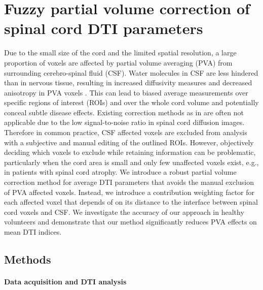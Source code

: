 \section{Fuzzy partial volume correction of spinal cord DTI parameters} 
Due to the small size of the cord and the limited spatial resolution, a large proportion of voxels are affected by partial volume averaging (PVA) from surrounding cerebro-spinal fluid (CSF). Water molecules in CSF are less hindered than in nervous tissue, resulting in increased diffusivity measures and decreased anisotropy in PVA voxels \citep{Alexander:2001,Pfefferbaum:2003}. This can lead to biased average measurements over specific regions of interest (ROIs) and over the whole cord volume and potentially conceal subtle disease effects. Existing correction methods as in \citet{Pasternak:2009} are often not applicable due to the low signal-to-noise ratio in spinal cord diffusion images. Therefore in common practice, CSF affected voxels are excluded from analysis with a subjective and manual editing of the outlined ROIs. However, objectively deciding which voxels to exclude while retaining information can be problematic, particularly when the cord area is small and only few unaffected voxels exist, e.g., in patients with spinal cord atrophy. We introduce a robust partial volume correction method for average DTI parameters that avoids the manual exclusion of PVA affected voxels. Instead, we introduce a contribution weighting factor for each affected voxel that depends of on its distance to the interface between spinal cord voxels and CSF. We investigate the accuracy of our approach in healthy volunteers and demonstrate that our method significantly reduces PVA effects on mean DTI indices. 
\subsection*{Methods} 
\paragraph{Data acquisition and DTI analysis}

\begin{figure}
  \centering
  \label{fig:experiment2_weightingillustration}
\end{figure}

